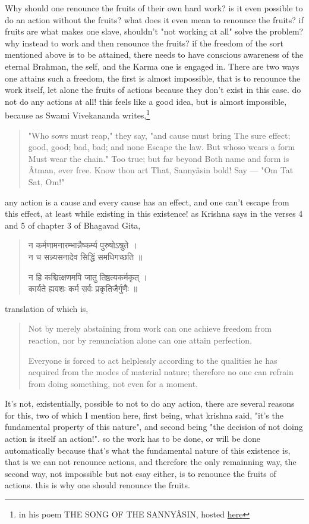 \documentclass[a4paper]{article}
\begin{document}
Why should one renounce the fruits of their own hard work? is it even possible to do an action without
the fruits? what does it even mean to renounce the fruits? if fruits are what makes one slave, shouldn't
"not working at all" solve the problem? why instead to work and then renounce the fruits?
if the freedom of the sort mentioned above is to be attained, there needs to have conscious awareness
of the eternal Brahman, the self, and the Karma one is engaged in.
There are two ways one attains such a freedom, the first is almost impossible, 
that is to renounce the work itself, let alone the fruits of actions because they don't exist in this case.
do not do any actions at all! this feels like a good idea, but is almost impossible, because as Swami Vivekananda 
writes,\footnote{in his poem THE SONG OF THE SANNYÂSIN, hosted \href{https://www.ramakrishnavivekananda.info/vivekananda/volume\_4/writings\_poems/the\_song\_of\_the\_sannyasin.htm}{here}}
\begin{quote}
"Who sows must reap," they say, "and cause must bring
The sure effect; good, good; bad, bad; and none
Escape the law. But whoso wears a form
Must wear the chain." Too true; but far beyond
Both name and form is Âtman, ever free.
Know thou art That, Sannyâsin bold! Say — "Om Tat Sat, Om!"
\end{quote}
any action is a cause
and every cause has an effect, and one can't escape from this effect, at least while existing in this 
existence! as Krishna says in the verses 4 and 5 of chapter 3 of Bhagavad Gita,
\begin{quote}
\begin{sanskrit}
    न कर्मणामनारम्भान्नैष्कर्म्य पुरुषोऽश्न‍ुते ।
\\न च सन्न्यसनादेव सिद्धिं समधिगच्छति ॥ 
\end{sanskrit}

\begin{sanskrit}
    न हि कश्चित्क्षणमपि जातु तिष्ठत्यकर्मकृत् ।
    \\कार्यते ह्यवशः कर्म सर्वः प्रकृतिजैर्गुणैः ॥
\end{sanskrit}
\end{quote}
translation of which is,
\begin{quote}
    Not by merely abstaining from work can one achieve freedom from reaction, nor by renunciation alone can one attain perfection.

    Everyone is forced to act helplessly according to the qualities he has acquired from the modes of material nature; therefore no one can refrain from doing something, not even for a moment.
\end{quote}
It's not, existentially, possible to not to do any action, there are several reasons for this, two of which 
I mention here, first being, what krishna said, "it's the fundamental property of this nature", and
second being "the decision of not doing action is itself an action!". so the work has to be done,
or will be done automatically because that's what the fundamental nature of this existence is, that is
we can not renounce actions, and therefore the only remainning way, the second way, not impossible 
but not esay either, is to renounce the fruits of actions. this is why one should renounce the fruits.
\end{document}
